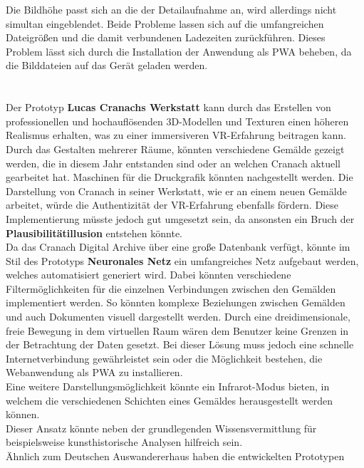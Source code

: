 \documentclass[a4paper,12pt,oneside]{article}
\begin{document}
    Die Bildhöhe passt sich an die der Detailaufnahme an,
    wird allerdings nicht simultan eingeblendet.
    Beide Probleme lassen sich auf die umfangreichen Dateigrößen und 
    die damit verbundenen Ladezeiten zurückführen.
    Dieses Problem lässt sich durch die Installation der Anwendung
    als PWA beheben, da die Bilddateien auf das Gerät geladen
    werden. \\ \\ \\
    Der Prototyp \textbf{Lucas Cranachs Werkstatt} kann durch das Erstellen
    von professionellen und hochauflösenden 3D-Modellen und Texturen
    einen höheren Realismus erhalten, was zu einer immersiveren
    VR-Erfahrung beitragen kann. Durch das Gestalten mehrerer Räume,
    könnten verschiedene
    Gemälde gezeigt werden, die in diesem Jahr entstanden sind oder an
    welchen Cranach aktuell gearbeitet hat. 
    Maschinen für die Druckgrafik könnten nachgestellt werden.
    Die Darstellung von Cranach in seiner Werkstatt, wie er an
    einem neuen Gemälde arbeitet, würde die Authentizität der VR-Erfahrung
    ebenfalls fördern. Diese Implementierung müsste jedoch gut umgesetzt sein,
    da ansonsten ein Bruch der \textbf{Plausibilitätillusion}
    entstehen könnte. \\
    Da das Cranach Digital Archive über eine große Datenbank verfügt,
    könnte im Stil des Prototyps \textbf{Neuronales Netz} ein 
    umfangreiches Netz aufgebaut werden, welches
    automatisiert generiert wird. Dabei könnten verschiedene 
    Filtermöglichkeiten für die einzelnen Verbindungen zwischen den 
    Gemälden implementiert werden. So könnten komplexe Beziehungen
    zwischen Gemälden und auch Dokumenten visuell dargestellt werden.
    Durch eine dreidimensionale, freie Bewegung in dem virtuellen Raum 
    wären dem Benutzer keine Grenzen in der Betrachtung der Daten gesetzt.
    Bei dieser Lösung muss jedoch eine schnelle Internetverbindung 
    gewährleistet sein oder die Möglichkeit bestehen, die Webanwendung
    als PWA zu installieren. \\
    Eine weitere Darstellungsmöglichkeit könnte ein Infrarot-Modus bieten,
    in welchem die verschiedenen Schichten eines Gemäldes herausgestellt
    werden können. \\ 
    Dieser Ansatz könnte neben der 
    grundlegenden Wissensvermittlung für 
    beispielsweise kunsthistorische Analysen hilfreich sein. \\
    Ähnlich zum Deutschen Auswandererhaus haben die entwickelten Prototypen 
\end{document}
